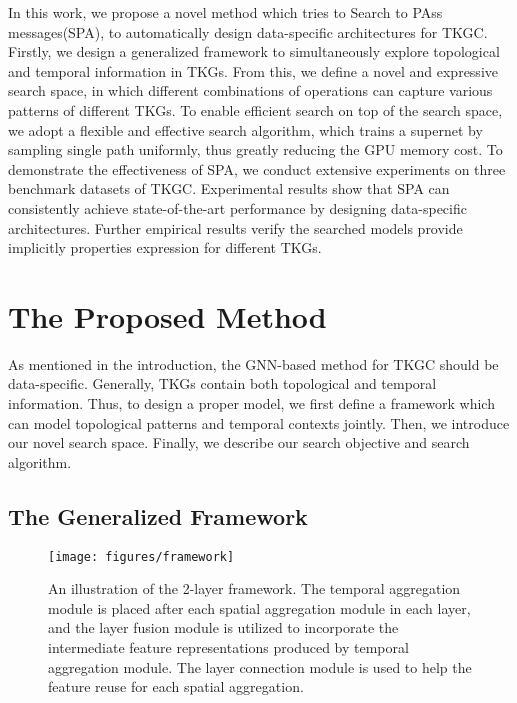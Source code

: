 \documentclass[11pt]{article}
\begin{document}
In this work, 
we propose a novel method which tries to Search to PAss messages(SPA), 
to automatically design data-specific architectures for TKGC. 
Firstly, 
we design a generalized framework 
to simultaneously explore topological and temporal information in TKGs. 
From this, 
we define a novel and expressive search space, 
in which different combinations of operations can capture various patterns of different TKGs. 
To enable efficient search on top of the search space, 
we adopt a flexible and effective search algorithm, 
which trains a supernet by sampling single path uniformly, 
thus greatly reducing the GPU memory cost. 
To demonstrate the effectiveness of SPA, 
we conduct extensive experiments on three benchmark datasets of TKGC. 
Experimental results show that SPA can consistently achieve state-of-the-art performance by designing data-specific architectures. 
Further empirical results verify the searched models provide implicitly properties expression for different TKGs.

\section{The Proposed Method}
As mentioned in the introduction, 
the GNN-based method for TKGC should be data-specific.
Generally, 
TKGs contain both topological and temporal information. 
Thus, 
to design a proper model, 
we first define a framework which can model topological patterns and temporal contexts jointly. 
Then, 
we introduce our novel search space.
Finally, we describe our search objective and search algorithm.

\subsection{The Generalized Framework}\label{sec-framework}

\begin{figure}[t]
	\centering
	\texttt{[image: figures/framework]}
	\caption{An illustration of the 2-layer framework. 
		The temporal aggregation module is placed after each spatial aggregation module in each layer, 
		and the layer fusion module is utilized to incorporate the intermediate feature representations produced by temporal aggregation module. 
		The layer connection module is used to help the feature reuse for each spatial aggregation.}
	\label{fig-framework1}
	\vspace{-10px}
\end{figure}
\end{document}
